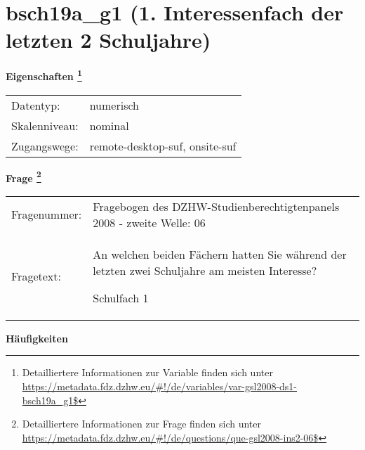 
    \setcounter{footnote}{0}

    \vspace*{-1.8cm}
	\section{bsch19a\_g1 (1. Interessenfach der letzten 2 Schuljahre)}
	\label{section:bsch19a_g1}



    \vspace*{0.5cm}
    \noindent\textbf{Eigenschaften
	\footnote{Detailliertere Informationen zur Variable finden sich unter
		\url{https://metadata.fdz.dzhw.eu/\#!/de/variables/var-gsl2008-ds1-bsch19a_g1$}}}\\
	\begin{tabularx}{\hsize}{@{}lX}
	Datentyp: & numerisch \\
	Skalenniveau: & nominal \\
	Zugangswege: &
	  remote-desktop-suf, 
	  onsite-suf
 \\
    \end{tabularx}



				\vspace*{0.5cm}
                \noindent\textbf{Frage
	                \footnote{Detailliertere Informationen zur Frage finden sich unter
		              \url{https://metadata.fdz.dzhw.eu/\#!/de/questions/que-gsl2008-ins2-06$}}}\\
				\begin{tabularx}{\hsize}{@{}lX}
					Fragenummer: &
					  Fragebogen des DZHW-Studienberechtigtenpanels 2008 - zweite Welle:
					  06
 \\
					Fragetext: & An welchen beiden Fächern hatten Sie während der letzten zwei Schuljahre am meisten Interesse?\par  Schulfach 1 \\
				\end{tabularx}





        		\vspace*{0.5cm}
                \noindent\textbf{Häufigkeiten}

